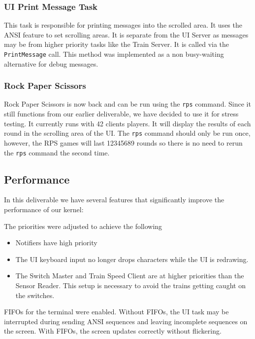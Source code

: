\documentclass[letterpaper]{article}
\begin{document}
\subsubsection{UI Print Message Task%
  \label{ui-print-message-task}%
}

This task is responsible for printing messages into the scrolled area. It uses the ANSI feature to set scrolling areas. It is separate from the UI Server as messages may be from higher priority tasks like the Train Server. It is called via the \texttt{PrintMessage} call.  This method was implemented as a non busy-waiting alternative for debug messages.


\subsubsection{Rock Paper Scissors%
  \label{rock-paper-scissors}%
}

Rock Paper Scissors is now back and can be run using the \texttt{rps} command.  Since it still functions from our earlier deliverable, we have decided to use it for stress testing.  It currently runs with 42 clients players.  It will display the results of each round in the scrolling area of the UI. The \texttt{rps} command should only be run once, however, the RPS games will last 12345689 rounds so there is no need to rerun the \texttt{rps} command the second time.


\subsection{Performance%
  \label{performance}%
}

In this deliverable we have several features that significantly improve the performance of our kernel:
\setcounter{listcnt0}{0}
\begin{list}{)}
{
\setlength{\rightmargin}{\leftmargin}
}

\item The priorities were adjusted to achieve the following
%
\begin{itemize}

\item Notifiers have high priority

\item The UI keyboard input no longer drops characters while the UI is redrawing.

\item The Switch Master and Train Speed Client are at higher priorities than the Sensor Reader. This setup is necessary to avoid the trains getting caught on the switches.

\end{itemize}

\item FIFOs for the terminal were enabled. Without FIFOs, the UI task may be interrupted during sending ANSI sequences and leaving incomplete sequences on the screen. With FIFOs, the screen updates correctly without flickering.
\end{list}
\end{document}
